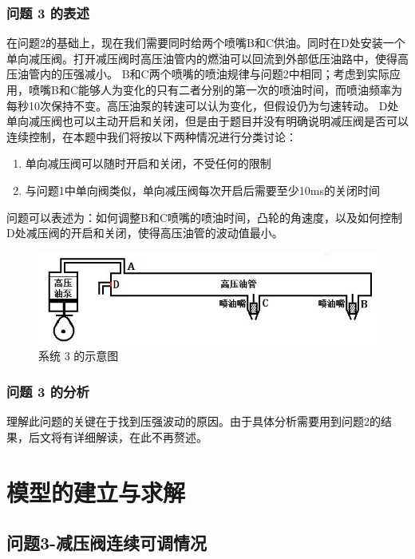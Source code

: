 \documentclass{article}
\begin{document}
	\subsubsection{问题 3 的表述}
	在问题2的基础上，现在我们需要同时给两个喷嘴B和C供油。同时在D处安装一个单向减压阀。打开减压阀时高压油管内的燃油可以回流到外部低压油路中，使得高压油管内的压强减小。
	B和C两个喷嘴的喷油规律与问题2中相同；考虑到实际应用，喷嘴B和C能够人为变化的只有二者分别的第一次的喷油时间，而喷油频率为每秒10次保持不变。高压油泵的转速可以认为变化，但假设仍为匀速转动。
	D处单向减压阀也可以主动开启和关闭，但是由于题目并没有明确说明减压阀是否可以连续控制，在本题中我们将按以下两种情况进行分类讨论：
	\begin{enumerate}
		\item 单向减压阀可以随时开启和关闭，不受任何的限制
		\item 与问题1中单向阀类似，单向减压阀每次开启后需要至少10ms的关闭时间
	\end{enumerate}
	问题可以表述为：如何调整B和C喷嘴的喷油时间，凸轮的角速度，以及如何控制D处减压阀的开启和关闭，使得高压油管的波动值最小。
	\begin{figure}[!ht]
		\centering
		\includegraphics[scale = 1.1]{sketch3.jpg}
		\caption{系统 3 的示意图}
	\end{figure}
	\subsubsection{问题 3 的分析}
	理解此问题的关键在于找到压强波动的原因。由于具体分析需要用到问题2的结果，后文将有详细解读，在此不再赘述。
	
\section{模型的建立与求解}
	\subsection{问题3-减压阀连续可调情况}
\end{document}
